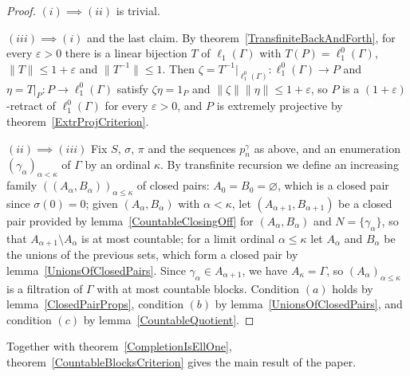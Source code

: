 \documentclass[12pt]{article}
\newcommand{\lo}[1]{\ell_1^0(#1)}
\newcommand{\ellone}[1]{\ell_1(#1)}
\newcommand{\norm}[1]{\lVert #1\rVert}
\begin{document}
\begin{proof} $(i)\implies(ii)$ is trivial.

    $(iii)\implies(i)$ and the last claim. By theorem~\ref{TransfiniteBackAndForth},
    for every $\varepsilon>0$ there is a linear bijection $T$ of
    $\ellone{\Gamma}$ with $T(P)=\lo{\Gamma}$, $\norm{T}\leq 1+\varepsilon$
    and $\norm{T^{-1}}\leq 1$. Then $\zeta=T^{-1}|_{\lo{\Gamma}}:\lo{\Gamma}\to P$
    and $\eta=T|_P:P\to\lo{\Gamma}$ satisfy $\zeta\eta=1_P$ and
    $\norm{\zeta}\norm{\eta}\leq 1+\varepsilon$, so $P$ is a
    $(1+\varepsilon)$-retract of $\lo{\Gamma}$ for every $\varepsilon>0$, and
    $P$ is extremely projective by theorem~\ref{ExtrProjCriterion}.

    $(ii)\implies(iii)$ Fix $S$, $\sigma$, $\pi$ and the sequences
    $p^\gamma_n$ as above, and an enumeration ${(\gamma_\alpha)}_{\alpha<\kappa}$
    of $\Gamma$ by an ordinal $\kappa$. By transfinite recursion we define an
    increasing family ${((A_\alpha,B_\alpha))}_{\alpha\leq\kappa}$ of closed
    pairs: $A_0=B_0=\varnothing$, which is a closed pair since
    $\sigma(0)=0$; given $(A_\alpha,B_\alpha)$ with $\alpha<\kappa$, let
    $(A_{\alpha+1},B_{\alpha+1})$ be a closed pair provided by
    lemma~\ref{CountableClosingOff} for $(A_\alpha,B_\alpha)$ and
    $N=\{\gamma_\alpha\}$, so that $A_{\alpha+1}\setminus A_\alpha$ is at
    most countable; for a limit ordinal $\alpha\leq\kappa$ let $A_\alpha$ and
    $B_\alpha$ be the unions of the previous sets, which form a closed pair
    by lemma~\ref{UnionsOfClosedPairs}. Since $\gamma_\alpha\in A_{\alpha+1}$,
    we have $A_\kappa=\Gamma$, so ${(A_\alpha)}_{\alpha\leq\kappa}$ is a
    filtration of $\Gamma$ with at most countable blocks. Condition $(a)$
    holds by lemma~\ref{ClosedPairProps}, condition $(b)$ by
    lemma~\ref{UnionsOfClosedPairs}, and condition $(c)$ by
    lemma~\ref{CountableQuotient}.
\end{proof}

Together with theorem~\ref{CompletionIsEllOne}, theorem~\ref{CountableBlocksCriterion}
gives the main result of the paper.
\end{document}
